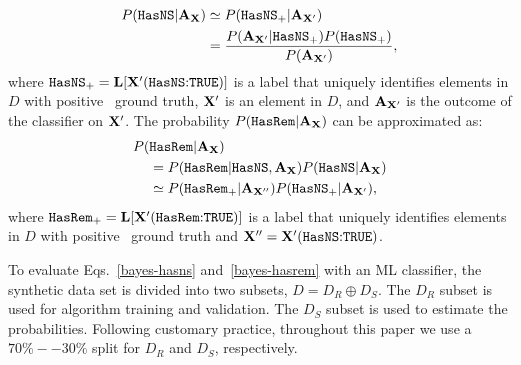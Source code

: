 \begin{align}
\label{bayes-hasns}
P({{\tt HasNS}}|{\bf A}_{\bf X})&\simeq P({{\tt HasNS}}_+|{\bf A}_{{\bf X}'}) \nonumber \\
&=\frac{P({\bf A}_{{\bf X}'}|{{\tt HasNS}}_+)P({{\tt HasNS}}_+)}{P({\bf A}_{{\bf X}'})},
\end{align}
where ${{\tt HasNS}}_+={\bf L}[{\bf X}'(\hbox{{{\tt HasNS}}:{{\tt TRUE}}})]$ is a label that uniquely identifies elements in $D$ with positive \hasns\ ground truth, ${\bf X}'$ is an element in $D$, and ${\bf A}_{{\bf X}'}$ is the outcome of the classifier on ${\bf X}'$. The probability $P({{\tt HasRem}}|{\bf A}_{\bf X})$ can be approximated as:
\begin{align}
\label{bayes-hasrem}
P(&{{\tt HasRem}}|{\bf A}_{\bf X}) \\
&=P({{\tt HasRem}}|{{\tt HasNS}}, {\bf A}_{\bf X})P({{\tt HasNS}}|{\bf A}_{\bf X}) \nonumber \\
&\simeq P({{\tt HasRem}}_+|{\bf A}_{{\bf X}''})P({{\tt HasNS}}_+|{\bf A}_{{\bf X}'}),
\end{align}
where ${{\tt HasRem}}_+={\bf L}[{\bf X}'(\hbox{{{\tt HasRem}}:{{\tt TRUE}}})]$ is a label that uniquely identifies elements in $D$ with positive \hasrem\ ground truth and ${\bf X}''= {\bf X}'(\hbox{{{\tt HasNS}}:{{\tt TRUE}}})$.

To evaluate Eqs.~\eqref{bayes-hasns} and~\eqref{bayes-hasrem} with an \ac{ML} classifier, the synthetic data set is divided into two subsets, $D=D_R\oplus D_S$. The $D_R$ subset is used for
algorithm training and validation. The $D_S$ subset is used to estimate the probabilities. Following customary practice, throughout this paper we use a $70\%--30\%$ split for $D_R$ and $D_S$,
respectively.

